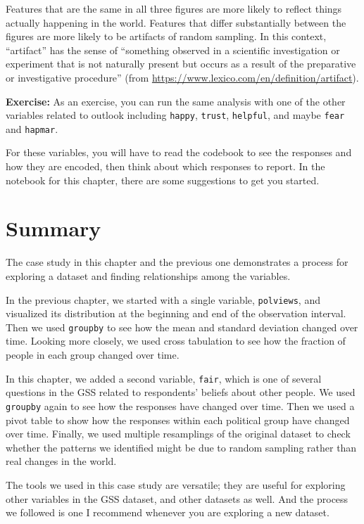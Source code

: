Features that are the same in all three figures are more likely to
reflect things actually happening in the world. Features that differ
substantially between the figures are more likely to be artifacts of
random sampling. In this context, ``artifact'' has the sense of
``something observed in a scientific investigation or experiment that is
not naturally present but occurs as a result of the preparative or
investigative procedure'' (from
\url{https://www.lexico.com/en/definition/artifact}).

\textbf{Exercise:} As an exercise, you can run the same analysis with
one of the other variables related to outlook including
\passthrough{\lstinline!happy!}, \passthrough{\lstinline!trust!},
\passthrough{\lstinline!helpful!}, and maybe
\passthrough{\lstinline!fear!} and \passthrough{\lstinline!hapmar!}.

For these variables, you will have to read the codebook to see the
responses and how they are encoded, then think about which responses to
report. In the notebook for this chapter, there are some suggestions to
get you started.

\hypertarget{summary}{%
\section{Summary}\label{summary}}

The case study in this chapter and the previous one demonstrates a
process for exploring a dataset and finding relationships among the
variables.

In the previous chapter, we started with a single variable,
\passthrough{\lstinline!polviews!}, and visualized its distribution at
the beginning and end of the observation interval. Then we used
\passthrough{\lstinline!groupby!} to see how the mean and standard
deviation changed over time. Looking more closely, we used cross
tabulation to see how the fraction of people in each group changed over
time.

In this chapter, we added a second variable,
\passthrough{\lstinline!fair!}, which is one of several questions in the
GSS related to respondents' beliefs about other people. We used
\passthrough{\lstinline!groupby!} again to see how the responses have
changed over time. Then we used a pivot table to show how the responses
within each political group have changed over time. Finally, we used
multiple resamplings of the original dataset to check whether the
patterns we identified might be due to random sampling rather than real
changes in the world.

The tools we used in this case study are versatile; they are useful for
exploring other variables in the GSS dataset, and other datasets as
well. And the process we followed is one I recommend whenever you are
exploring a new dataset.

